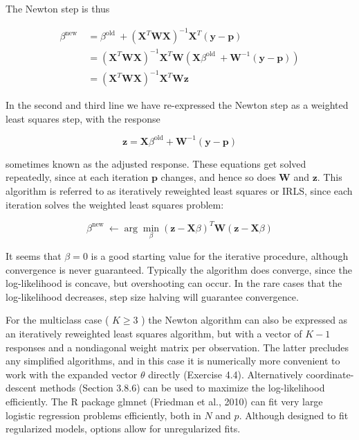 \documentclass[10pt]{article}
\begin{document}
The Newton step is thus


\begin{align*}
\beta^{\text {new }} & =\beta^{\text {old }}+\left(\mathbf{X}^{T} \mathbf{W} \mathbf{X}\right)^{-1} \mathbf{X}^{T}(\mathbf{y}-\mathbf{p}) \\
& =\left(\mathbf{X}^{T} \mathbf{W} \mathbf{X}\right)^{-1} \mathbf{X}^{T} \mathbf{W}\left(\mathbf{X} \beta^{\text {old }}+\mathbf{W}^{-1}(\mathbf{y}-\mathbf{p})\right) \\
& =\left(\mathbf{X}^{T} \mathbf{W} \mathbf{X}\right)^{-1} \mathbf{X}^{T} \mathbf{W} \mathbf{z} \tag{4.26}
\end{align*}


In the second and third line we have re-expressed the Newton step as a weighted least squares step, with the response


\begin{equation*}
\mathbf{z}=\mathbf{X} \beta^{\mathrm{old}}+\mathbf{W}^{-1}(\mathbf{y}-\mathbf{p}) \tag{4.27}
\end{equation*}


sometimes known as the adjusted response. These equations get solved repeatedly, since at each iteration $\mathbf{p}$ changes, and hence so does $\mathbf{W}$ and $\mathbf{z}$. This algorithm is referred to as iteratively reweighted least squares or IRLS, since each iteration solves the weighted least squares problem:


\begin{equation*}
\beta^{\text {new }} \leftarrow \arg \min _{\beta}(\mathbf{z}-\mathbf{X} \beta)^{T} \mathbf{W}(\mathbf{z}-\mathbf{X} \beta) \tag{4.28}
\end{equation*}


It seems that $\beta=0$ is a good starting value for the iterative procedure, although convergence is never guaranteed. Typically the algorithm does converge, since the log-likelihood is concave, but overshooting can occur. In the rare cases that the log-likelihood decreases, step size halving will guarantee convergence.

For the multiclass case ( $K \geq 3$ ) the Newton algorithm can also be expressed as an iteratively reweighted least squares algorithm, but with a vector of $K-1$ responses and a nondiagonal weight matrix per observation. The latter precludes any simplified algorithms, and in this case it is numerically more convenient to work with the expanded vector $\theta$ directly (Exercise 4.4). Alternatively coordinate-descent methods (Section 3.8.6) can be used to maximize the log-likelihood efficiently. The R package glmnet (Friedman et al., 2010) can fit very large logistic regression problems efficiently, both in $N$ and $p$. Although designed to fit regularized models, options allow for unregularized fits.
\end{document}
